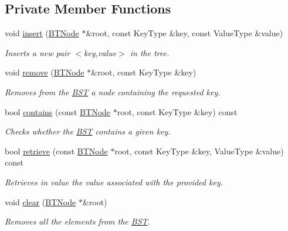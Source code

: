 \subsection*{Private Member Functions}
\begin{DoxyCompactItemize}
\item 
void \hyperlink{class_b_s_t_a2caab48e5c6f1400f7b9ae2e11fb1680}{insert} (\hyperlink{struct_b_s_t_1_1_b_t_node}{B\+T\+Node} $\ast$\&root, const Key\+Type \&key, const Value\+Type \&value)
\begin{DoxyCompactList}\small\item\em Inserts a new pair $<${\ttfamily key},{\ttfamily value}$>$ in the tree. \end{DoxyCompactList}\item 
void \hyperlink{class_b_s_t_ab3369784d746d15731edf741729f15ad}{remove} (\hyperlink{struct_b_s_t_1_1_b_t_node}{B\+T\+Node} $\ast$\&root, const Key\+Type \&key)
\begin{DoxyCompactList}\small\item\em Removes from the \hyperlink{class_b_s_t}{B\+ST} a node containing the requested key. \end{DoxyCompactList}\item 
bool \hyperlink{class_b_s_t_a3c014718dd218e2ca758af266cc0b787}{contains} (const \hyperlink{struct_b_s_t_1_1_b_t_node}{B\+T\+Node} $\ast$root, const Key\+Type \&key) const 
\begin{DoxyCompactList}\small\item\em Checks whether the \hyperlink{class_b_s_t}{B\+ST} contains a given key. \end{DoxyCompactList}\item 
bool \hyperlink{class_b_s_t_ad4e63b5360a5252606dece4c5972c36d}{retrieve} (const \hyperlink{struct_b_s_t_1_1_b_t_node}{B\+T\+Node} $\ast$root, const Key\+Type \&key, Value\+Type \&value) const 
\begin{DoxyCompactList}\small\item\em Retrieves in {\ttfamily value} the value associated with the provided key. \end{DoxyCompactList}\item 
void \hyperlink{class_b_s_t_a55ef77647f785480d292d2315550f734}{clear} (\hyperlink{struct_b_s_t_1_1_b_t_node}{B\+T\+Node} $\ast$\&root)
\begin{DoxyCompactList}\small\item\em Removes all the elements from the \hyperlink{class_b_s_t}{B\+ST}. \end{DoxyCompactList}\item 

\end{DoxyCompactItemize}
